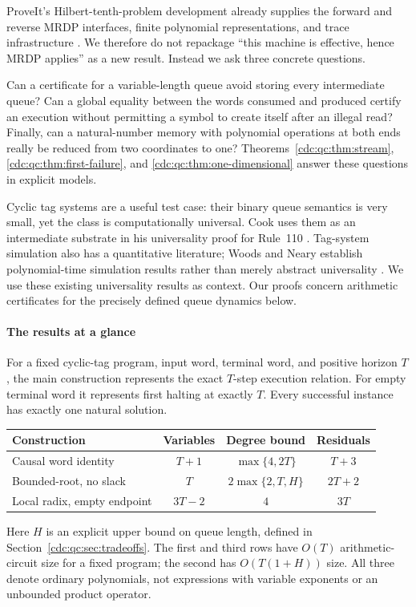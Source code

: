 \documentclass[11pt,a4paper]{article}
\theoremstyle{definition}
\theoremstyle{remark}
\begin{document}
ProveIt's Hilbert-tenth-problem development already supplies the forward and reverse MRDP interfaces, finite polynomial representations, and trace infrastructure \cite{repo-mrdp,repo-h10}. We therefore do not repackage ``this machine is effective, hence MRDP applies'' as a new result. Instead we ask three concrete questions.

Can a certificate for a variable-length queue avoid storing every intermediate queue? Can a global equality between the words consumed and produced certify an execution without permitting a symbol to create itself after an illegal read? Finally, can a natural-number memory with polynomial operations at both ends really be reduced from two coordinates to one? Theorems~\ref{cdc:qc:thm:stream}, \ref{cdc:qc:thm:first-failure}, and \ref{cdc:qc:thm:one-dimensional} answer these questions in explicit models.

Cyclic tag systems are a useful test case: their binary queue semantics is very small, yet the class is computationally universal. Cook uses them as an intermediate substrate in his universality proof for Rule~110 \cite{cook}. Tag-system simulation also has a quantitative literature; Woods and Neary establish polynomial-time simulation results rather than merely abstract universality \cite{woods-neary}. We use these existing universality results as context. Our proofs concern arithmetic certificates for the precisely defined queue dynamics below.

\paragraph{The results at a glance}
For a fixed cyclic-tag program, input word, terminal word, and positive horizon $T$, the main construction represents the exact $T$-step execution relation. For empty terminal word it represents first halting at exactly $T$. Every successful instance has exactly one natural solution.

\begin{center}
\small
\begin{tabularx}{\textwidth}{@{}Xccc@{}}
\toprule
Construction & Variables & Degree bound & Residuals\\
\midrule
Causal word identity & $T+1$ & $\max\{4,2T\}$ & $T+3$\\
Bounded-root, no slack & $T$ & $2\max\{2,T,H\}$ & $2T+2$\\
Local radix, empty endpoint & $3T-2$ & $4$ & $3T$\\
\bottomrule
\end{tabularx}
\end{center}
Here $H$ is an explicit upper bound on queue length, defined in Section~\ref{cdc:qc:sec:tradeoffs}. The first and third rows have $O(T)$ arithmetic-circuit size for a fixed program; the second has $O(T(1+H))$ size. All three denote ordinary polynomials, not expressions with variable exponents or an unbounded product operator.
\end{document}
